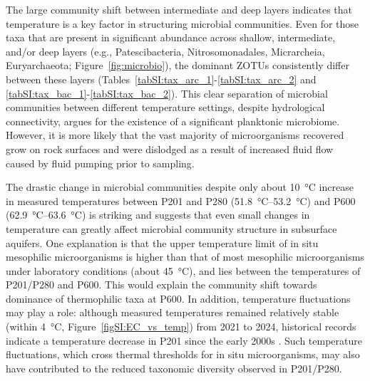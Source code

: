 The large community shift between intermediate and deep layers indicates that temperature is a key factor in structuring microbial communities.
Even for those taxa that are present in significant abundance across shallow, intermediate, and/or deep layers (e.g., Patescibacteria, Nitrosomonadales, Micrarcheia, Euryarchaeota; Figure~\ref{fig:microbio}), the dominant ZOTUs consistently differ between these layers (Tables~\ref{tabSI:tax_arc_1}-\ref{tabSI:tax_arc_2} and \ref{tabSI:tax_bac_1}-\ref{tabSI:tax_bac_2}).
This clear separation of microbial communities between different temperature settings, despite hydrological connectivity, argues for the existence of a significant planktonic microbiome.
However, it is more likely that the vast majority of microorganisms recovered grow on rock surfaces and were dislodged as a result of increased fluid flow caused by fluid pumping prior to sampling.

The drastic change in microbial communities despite only about \SI{10}{\celsius} increase in measured temperatures between P201 and P280 (\SIrange{51.8}{53.2}{\celsius}) and P600 (\SIrange{62.9}{63.6}{\celsius}) is striking and suggests that even small changes in temperature can greatly affect microbial community structure in subsurface aquifers.
One explanation is that the upper temperature limit of in situ mesophilic microorganisms is higher than that of most mesophilic microorganisms under laboratory conditions (about \SI{45}{\celsius}), and lies between the temperatures of P201/P280 and P600.
This would explain the community shift towards dominance of thermophilic taxa at P600.
In addition, temperature fluctuations may play a role: although measured temperatures remained relatively stable (within \SI{4}{\celsius}, Figure~\ref{figSI:EC_vs_temp}) from 2021 to 2024, historical records indicate a temperature decrease in P201 since the early 2000s \citep{sonney2009numerical}.
Such temperature fluctuations, which cross thermal thresholds for in situ microorganisms, may also have contributed to the reduced taxonomic diversity observed in P201/P280.


